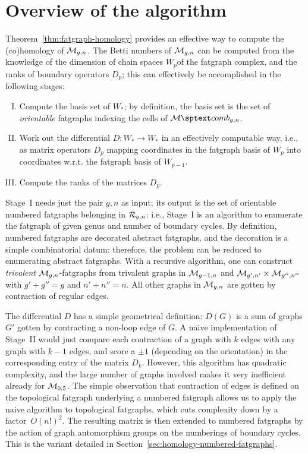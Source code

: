 \section[Overview]{Overview of the algorithm}
\label{sec:overview}

Theorem~\ref{thm:fatgraph-homology} provides an effective way to compute the
(co)homology of $\mathcal{M}_{g,n}$.  The Betti numbers of $\mathcal{M}_{g,n}$ can be
computed from the knowledge of the dimension of chain spaces $W_p$of
the fatgraph complex, and the ranks of boundary operators $D_p$;
this can effectively be accomplished in the following stages:
\begin{enumerate}[I.]
\item Compute the basis set of $W_*$; by definition, the basis set is
  the set of \emph{orientable} fatgraphs indexing
  the cells of $\Mcomb_{g,n}$.
\item Work out the differential $D: W_* \to W_*$ in an
  effectively computable way, i.e., as matrix operators $D_p$ mapping
  coordinates in the fatgraph basis of $W_p$ into coordinates
  w.r.t. the fatgraph basis of $W_{p-1}$.
\item Compute the ranks of the matrices $D_p$.
\end{enumerate}

Stage~I needs just the pair $g,n$ as input; its output is the set of
orientable numbered fatgraphs belonging in $\mathcal{R}_{g,n}$: i.e., Stage~I
is an algorithm to enumerate the fatgraph of given genus and number of
boundary cycles. By definition, numbered fatgraphs are decorated
abstract fatgraphs, and the decoration is a simple combinatorial
datum: therefore, the problem can be reduced to enumerating abstract
fatgraphs.  With a recursive algorithm, one can construct
\emph{trivalent} $\mathcal{M}_{g,n}$-fatgraphs from trivalent graphs in
$\mathcal{M}_{g-1,n}$ and $\mathcal{M}_{g',n'} \times \mathcal{M}_{g'',n''}$ with $g'+g''=g$ and
$n'+n''=n$.  All other graphs in $\mathcal{M}_{g,n}$ are gotten by contraction
of regular edges.

The differential $D$ has a simple geometrical definition: $D(G)$ is a
sum of graphs $G'$ gotten by contracting a non-loop edge of $G$. A
naive implementation of Stage~II would just compare each contraction
of a graph with $k$ edges with any graph with $k-1$ edges, and score a
$\pm 1$ (depending on the orientation) in the corresponding entry of
the matrix $D_k$.  However, this algorithm has quadratic complexity,
and the large number of graphs involved makes it very inefficient
already for $\mathcal{M}_{0,5}$.  The simple observation that contraction of
edges is defined on the topological fatgraph underlying a numbered
fatgraph allows us to apply the naive algorithm to topological
fatgraphs, which cuts complexity down by a factor~$O(n!)^2$.  The
resulting matrix is then extended to numbered fatgraphs by the action
of graph automorphism groups on the numberings of boundary cycles.
This is the variant detailed in Section~\ref{sec:homology-numbered-fatgraphs}.

